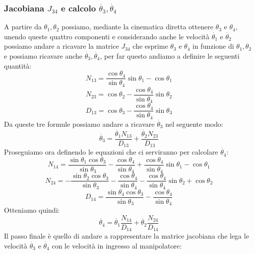 \subsubsection{Jacobiana $J_{34}$ e calcolo $\dot{\theta_3},\dot{\theta_4}$}
A partire da $\theta_1, \theta_2$ possiamo, mediante la cinematica diretta ottenere $\theta_3$ e $\theta_4$, unendo queste quattro componenti e considerando anche le velocità $\dot{\theta_1}$ e $\dot{\theta_2}$ possiamo andare a ricavare la matrice $J_{34}$ che esprime $\theta_3$ e $\theta_4$ in funzione di $\theta_1, \theta_2$ e possiamo ricavare anche $\dot{\theta_3}, \dot{\theta_4}$, per far questo andiamo a definire le seguenti quantità:
\begin{equation*}
    N_{13} = \frac{\cos\theta_4}{\sin\theta_4}\sin\theta_1-\cos\theta_1
\end{equation*}
\begin{equation*}
    N_{23} = \cos\theta_2-\frac{\cos\theta_4}{\sin\theta_4}\sin\theta_2
\end{equation*}
\begin{equation*}
    D_{13} = \cos\theta_3-\frac{\cos\theta_4}{\sin\theta_4}\sin\theta_3
\end{equation*}
Da queste tre formule possiamo andare a ricavare $\dot{\theta_3}$ nel seguente modo:
\begin{equation}
    \dot{\theta_3} = \frac{\dot{\theta_1}N_{13}}{D_{13}}+\frac{\dot{\theta_2}N_{23}}{D_{13}}
\end{equation}
Proseguiamo ora definendo le equazioni che ci serviranno per calcolare $\dot{\theta_4}$:
\begin{equation*}
    N_{14} = \frac{\sin\theta_1\cos\theta_3}{\sin\theta_3}-\frac{\cos\theta_4}{\sin\theta_4}+\frac{\cos\theta_4}{\sin\theta_4}\sin\theta_1 - \cos\theta_1
\end{equation*}
\begin{equation*}
    N_{24} = -\frac{\sin\theta_2\cos\theta_3}{\sin\theta_3}-\frac{\cos\theta_4}{\sin\theta_4}-\frac{\cos\theta_4}{\sin\theta_4}\sin\theta_2+\cos\theta_2
\end{equation*}
\begin{equation*}
    D_{14} = \frac{\sin\theta_4\cos\theta_3}{\sin\theta_3}-\frac{\cos\theta_4}{\sin\theta_4}
\end{equation*}
Otteniamo quindi:
\begin{equation}
    \dot{\theta_4} = \dot{\theta_1}\frac{N_{14}}{D_{14}}+\dot{\theta_2}\frac{N_{24}}{D_{14}}
\end{equation}
Il passo finale è quello di andare a rappresentare la matrice jacobiana che lega le velocità $\dot{\theta_3}$ e $\dot{\theta_4}$ con le velocità in ingresso al manipolatore:
